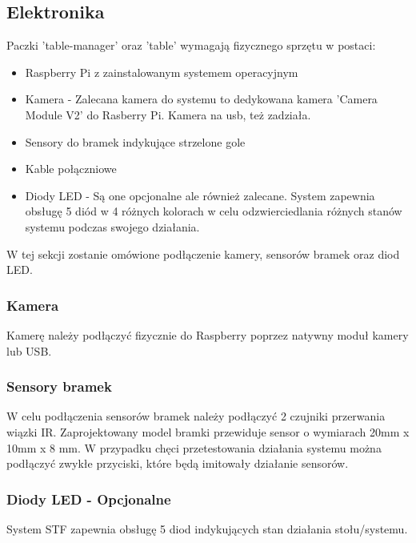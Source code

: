 \subsection{Elektronika}

Paczki 'table-manager' oraz 'table' wymagają fizycznego sprzętu w postaci:

\begin{itemize}
	\item Raspberry Pi z zainstalowanym systemem operacyjnym
	\item Kamera - Zalecana kamera do systemu to dedykowana kamera 'Camera Module V2' do Rasberry Pi. Kamera na usb, też zadziała.
	\item Sensory do bramek indykujące strzelone gole
	\item Kable połączniowe
	\item Diody LED - Są one opcjonalne ale również zalecane. System zapewnia obsługę 5 diód w 4 różnych kolorach w celu odzwierciedlania różnych stanów systemu podczas swojego działania.
\end{itemize}

W tej sekcji zostanie omówione podłączenie kamery, sensorów bramek oraz diod LED.

\subsubsection{Kamera}

Kamerę należy podłączyć fizycznie do Raspberry poprzez natywny moduł kamery lub USB.

\subsubsection{Sensory bramek}

W celu podłączenia sensorów bramek należy podłączyć 2 czujniki przerwania wiązki IR. Zaprojektowany model bramki przewiduje sensor o wymiarach 20mm x 10mm x 8 mm. W przypadku chęci przetestowania działania systemu można podłączyć zwykłe przyciski, które będą imitowały działanie sensorów.

\subsubsection{Diody LED - Opcjonalne}
System STF zapewnia obsługę 5 diod indykujących stan działania stołu/systemu.

